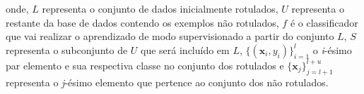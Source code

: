     \vspace{-2em}
    \noindent
	onde, $L$ representa o conjunto de dados inicialmente rotulados, $U$ representa o restante da base de dados contendo os exemplos não rotulados, $f$ é o classificador que vai realizar o aprendizado de modo supervisionado a partir do conjunto $L$, $S$ representa o subconjunto de $U$ que será incluído em $L$, $\{(\mathbf{x}_i, y_i)\}^l_{i = 1}$ o \textit{i}\hyp{ésimo} par elemento e sua respectiva classe no conjunto dos rotulados e $\{\mathbf{x}_j\}^{l+u}_{j=l+1}$ representa o \textit{j}\hyp{ésimo} elemento que pertence ao conjunto dos não rotulados.
